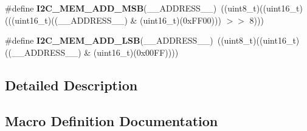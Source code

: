 \begin{DoxyCompactItemize}
\item 
\#define {\bfseries I2\+C\+\_\+\+M\+E\+M\+\_\+\+A\+D\+D\+\_\+\+M\+SB}(\+\_\+\+\_\+\+A\+D\+D\+R\+E\+S\+S\+\_\+\+\_\+)~((uint8\+\_\+t)((uint16\+\_\+t)(((uint16\+\_\+t)((\+\_\+\+\_\+\+A\+D\+D\+R\+E\+S\+S\+\_\+\+\_\+) \& (uint16\+\_\+t)(0x\+F\+F00))) $>$$>$ 8)))\hypertarget{group___i2_c___private___macros_ga2e42fa55be22240dc5a54a0304d01cfb}{}\label{group___i2_c___private___macros_ga2e42fa55be22240dc5a54a0304d01cfb}

\item 
\#define {\bfseries I2\+C\+\_\+\+M\+E\+M\+\_\+\+A\+D\+D\+\_\+\+L\+SB}(\+\_\+\+\_\+\+A\+D\+D\+R\+E\+S\+S\+\_\+\+\_\+)~((uint8\+\_\+t)((uint16\+\_\+t)((\+\_\+\+\_\+\+A\+D\+D\+R\+E\+S\+S\+\_\+\+\_\+) \& (uint16\+\_\+t)(0x00\+F\+F))))\hypertarget{group___i2_c___private___macros_ga9c8f1a763307d0c37bb4e2dcfdf3bb9f}{}\label{group___i2_c___private___macros_ga9c8f1a763307d0c37bb4e2dcfdf3bb9f}

\end{DoxyCompactItemize}


\subsection{Detailed Description}


\subsection{Macro Definition Documentation}
